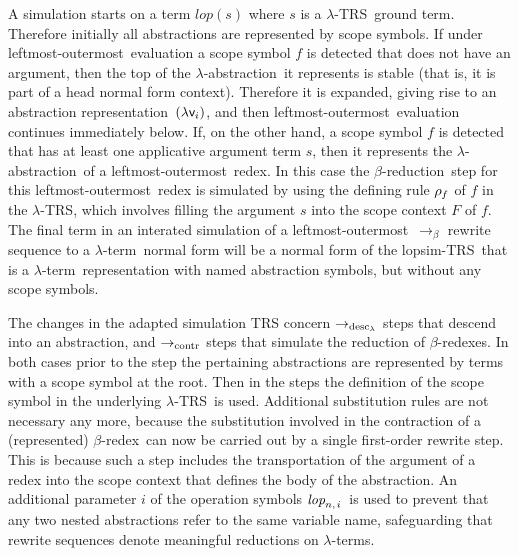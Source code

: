 \documentclass[
submission
]{dmtcs-episciences-tampered}
\newcommand{\fap}[2]{#1({#2})}
\newcommand{\iap}[2]{#1 _{#2}}
\newcommand{\indap}[2]{#1 _{#2}}
\newcommand{\supap}[2]{#1 ^{#2}}
\newcommand{\pap}{\supap}
\newcommand{\nb}{\nobreakdash}
\newcommand{\nf}{\normalfont}
\newcommand{\ater}{s}
\newcommand{\TRS}{TRS}
\newcommand{\sfonlabs}{\lambda}
\newcommand{\sfolabs}[1]{(\lambda{#1})}
\newcommand{\afovar}{\mathsf{v}}
\newcommand{\afovari}[1]{\indap{\afovar}{\hspace*{-0.25pt}#1}}
\newcommand{\afoscopesym}{f}
\newcommand{\afoscopecxt}{F}
\newcommand{\ruleof}[1]{\indap{\rho}{\hspace*{-0.3pt}#1}}
\newcommand{\slop}{\textit{lop}}\newcommand{\slopstar}{\pap{\slop}{*}}
\newcommand{\lopstart}{\fap{\slop}}
\newcommand{\slopni}[2]{\slop_{#1,\hspace*{1pt}#2}}
\newcommand{\lopsimTRS}{lopsim-TRS}
\newcommand{\sslabs}{\lambda}
\newcommand{\sred}{\to}
\newcommand{\sredi}{\indap{\sred}}
\newcommand{\scriptcontract}{\text{\nf contr}}
\newcommand{\scriptdescendinfolabs}{\iap{\text{\nf desc}}{\sfonlabs}}
\newcommand{\scontractred}{\sredi{\scriptcontract}}
\newcommand{\sbetared}{\sred_{\beta}}
\newcommand{\sdescendinfolabsred}{\sredi{\scriptdescendinfolabs}}
\newcommand{\lambdaabstraction}{$\sslabs$\nb-ab\-strac\-tion}
\newcommand{\lambdaterm}{$\lambda$\nb-term}
\newcommand{\lambdaterms}{\lambdaterm{s}}
\newcommand{\betareduction}{$\beta$\nb-re\-duc\-tion}
\newcommand{\betaredex}{$\beta$\nb-re\-dex}
\newcommand{\lo}{left\-most-outer\-most}
\newcommand{\lTRS}{$\lambda$\hspace*{-0.5pt}\nb-\hspace*{-0.5pt}\TRS}
\theoremstyle{plain}
\theoremstyle{definition}
\begin{document}
A simulation starts on a term $\lopstart{\ater}$ where $\ater$ is a \lTRS\ ground term.
Therefore initially all abstractions are represented by scope symbols.
If under \lo\ evaluation a scope symbol $\afoscopesym$ is detected that does not have an argument,
then the top of the \lambdaabstraction\ it represents is stable (that is, it is part of a head normal form context).
Therefore it is expanded, giving rise to an abstraction representation~$\sfolabs{\afovari{i}}$,
and then \lo\ evaluation continues immediately below.
If, on the other hand, a scope symbol $\afoscopesym$ is detected that has at least one applicative argument term $\ater$,
then it represents the \lambdaabstraction\ of a \lo\ redex. In this case the \betareduction\ step for this \lo\ redex
is simulated by using the defining rule $\ruleof{\afoscopesym}$ of $\afoscopesym$ in the \lTRS, which involves filling the argument $\ater$
into the scope context $\afoscopecxt$ of $\afoscopesym$. 
The final term in an interated simulation of a \lo\ $\sbetared$ rewrite sequence to a \lambdaterm\ normal form  
will be a normal form of the \lopsimTRS\
that is a \lambdaterm\ representation with named abstraction symbols, but without any scope symbols.


The changes in the adapted simulation TRS concern $\sdescendinfolabsred$ steps that descend into an abstraction,
and $\scontractred$ steps that simulate the reduction of \betaredex{es}.
In both cases prior to the step the pertaining abstractions are represented by terms with a scope symbol at the root.
Then in the steps the definition of the scope symbol in the underlying \lTRS\ is used.
Additional substitution rules are not necessary any more, because
the substitution involved in the contraction of a (represented) \betaredex\ 
can now be carried out by a single first-order rewrite step.
This is because such a step includes the transportation of the argument of a redex
into the scope context that defines the body of the abstraction. An additional parameter $i$ of the operation symbols $\slopni{n}{i}\,$ 
is used to prevent that any two nested abstractions refer to the same variable name,
safeguarding that rewrite sequences denote meaningful reductions on \lambdaterms.

\smallskip
\end{document}
